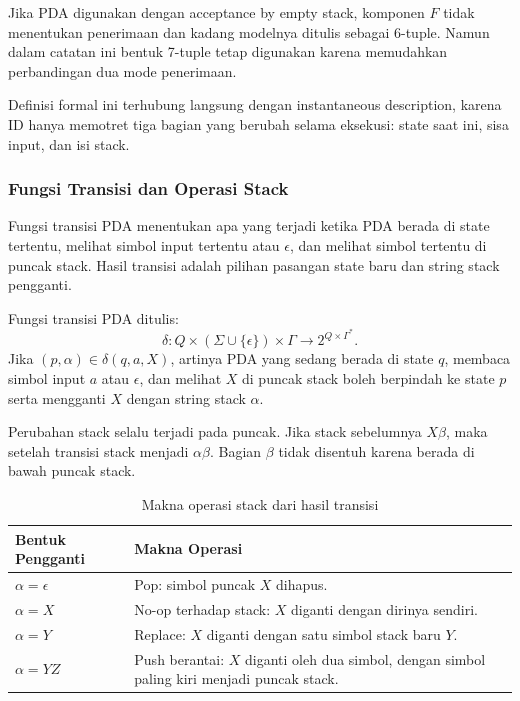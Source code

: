 Jika PDA digunakan dengan acceptance by empty stack, komponen $F$ tidak menentukan penerimaan dan kadang modelnya ditulis sebagai 6-tuple. Namun dalam catatan ini bentuk 7-tuple tetap digunakan karena memudahkan perbandingan dua mode penerimaan.

Definisi formal ini terhubung langsung dengan instantaneous description, karena ID hanya memotret tiga bagian yang berubah selama eksekusi: state saat ini, sisa input, dan isi stack.

\subsubsection{Fungsi Transisi dan Operasi Stack}

\begin{jawab}
Fungsi transisi PDA menentukan apa yang terjadi ketika PDA berada di state tertentu, melihat simbol input tertentu atau $\epsilon$, dan melihat simbol tertentu di puncak stack. Hasil transisi adalah pilihan pasangan state baru dan string stack pengganti.
\end{jawab}

Fungsi transisi PDA ditulis:
\[
    \delta: Q \times (\Sigma \cup \{\epsilon\}) \times \Gamma \rightarrow 2^{Q \times \Gamma^*}.
\]
Jika $(p,\alpha) \in \delta(q,a,X)$, artinya PDA yang sedang berada di state $q$, membaca simbol input $a$ atau $\epsilon$, dan melihat $X$ di puncak stack boleh berpindah ke state $p$ serta mengganti $X$ dengan string stack $\alpha$.

Perubahan stack selalu terjadi pada puncak. Jika stack sebelumnya $X\beta$, maka setelah transisi stack menjadi $\alpha\beta$. Bagian $\beta$ tidak disentuh karena berada di bawah puncak stack.

\begin{table}[H]
\centering
\begin{tabularx}{\textwidth}{|L{0.24\textwidth}|X|}
\hline
\textbf{Bentuk Pengganti} & \textbf{Makna Operasi} \\
\hline
$\alpha=\epsilon$ & Pop: simbol puncak $X$ dihapus. \\
\hline
$\alpha=X$ & No-op terhadap stack: $X$ diganti dengan dirinya sendiri. \\
\hline
$\alpha=Y$ & Replace: $X$ diganti dengan satu simbol stack baru $Y$. \\
\hline
$\alpha=YZ$ & Push berantai: $X$ diganti oleh dua simbol, dengan simbol paling kiri menjadi puncak stack. \\
\hline
\end{tabularx}
\caption{Makna operasi stack dari hasil transisi}
\label{tab:operasi-stack-pda}
\end{table}

